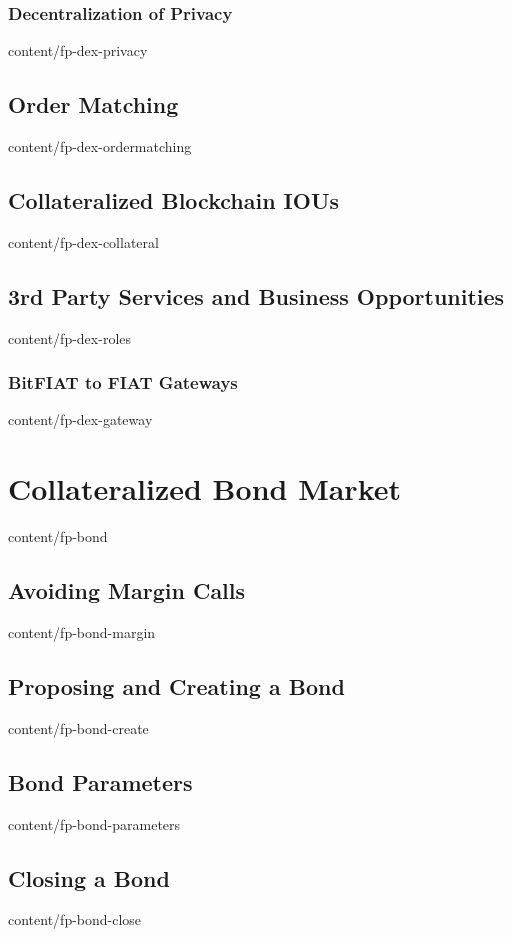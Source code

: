 \documentclass[conference,final,10pt,a4paper]{IEEEtran}
\begin{document}
\subsubsection { Decentralization of Privacy                     }  { content/fp-dex-privacy         } 
\subsection    { Order Matching                                  }  { content/fp-dex-ordermatching   } 
\subsection    { Collateralized Blockchain IOUs                  }  { content/fp-dex-collateral      } 
\subsection    { 3rd Party Services and Business Opportunities   }  { content/fp-dex-roles           } 
\subsubsection { BitFIAT to FIAT Gateways                        }  { content/fp-dex-gateway         } 

\section       { Collateralized Bond Market                      }  { content/fp-bond                } 
\subsection    { Avoiding Margin Calls                           }  { content/fp-bond-margin         } 
\subsection    { Proposing and Creating a Bond                   }  { content/fp-bond-create         } 
\subsection    { Bond Parameters                                 }  { content/fp-bond-parameters     } 
\subsection    { Closing a Bond                                  }  { content/fp-bond-close          } 
\end{document}

